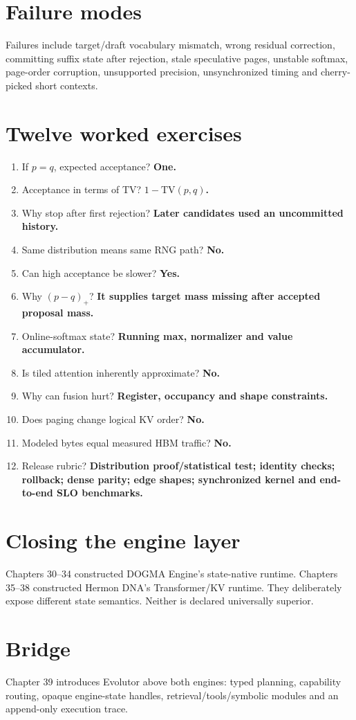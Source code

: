 \section{Failure modes}
Failures include target/draft vocabulary mismatch, wrong residual correction, committing suffix state after rejection, stale speculative pages, unstable softmax, page-order corruption, unsupported precision, unsynchronized timing and cherry-picked short contexts.

\section{Twelve worked exercises}
\begin{enumerate}
\item If $p=q$, expected acceptance? \textbf{One.}
\item Acceptance in terms of TV? \textbf{$1-\mathrm{TV}(p,q)$.}
\item Why stop after first rejection? \textbf{Later candidates used an uncommitted history.}
\item Same distribution means same RNG path? \textbf{No.}
\item Can high acceptance be slower? \textbf{Yes.}
\item Why $(p-q)_+$? \textbf{It supplies target mass missing after accepted proposal mass.}
\item Online-softmax state? \textbf{Running max, normalizer and value accumulator.}
\item Is tiled attention inherently approximate? \textbf{No.}
\item Why can fusion hurt? \textbf{Register, occupancy and shape constraints.}
\item Does paging change logical KV order? \textbf{No.}
\item Modeled bytes equal measured HBM traffic? \textbf{No.}
\item Release rubric? \textbf{Distribution proof/statistical test; identity checks; rollback; dense parity; edge shapes; synchronized kernel and end-to-end SLO benchmarks.}
\end{enumerate}

\section{Closing the engine layer}
Chapters 30--34 constructed DOGMA Engine's state-native runtime. Chapters 35--38 constructed Hermon DNA's Transformer/KV runtime. They deliberately expose different state semantics. Neither is declared universally superior.

\section{Bridge}
Chapter 39 introduces Evolutor above both engines: typed planning, capability routing, opaque engine-state handles, retrieval/tools/symbolic modules and an append-only execution trace.
